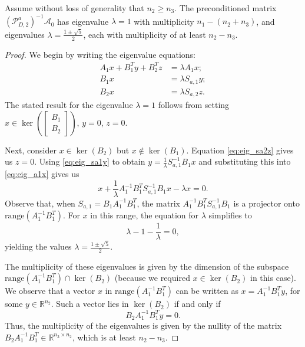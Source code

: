 \documentclass[10pt,a4paper]{amsart}
\newcommand{\range}{\mathrm{range}}
\newcommand{\sA}{\mathcal{A}}
\begin{document}
\begin{theorem}[Eigenvalues of $(\mathcal{P}_{D,2}^a)^{-1} \sA_0$]
Assume without loss of generality that $n_2 \ge n_3$. The preconditioned matrix $(\mathcal{P}_{D,2}^a)^{-1} \sA_0$ has eigenvalue $\lambda = 1$ with multiplicity $n_1-(n_2+n_3)$, and eigenvalues $\lambda = \frac{1 \pm \sqrt{5}}{2}$, each with multiplicity of at least $n_2-n_3$.
\end{theorem}

\begin{proof}
    We begin by writing the eigenvalue equations:
    \begin{subequations}\label{eq:eig_blocktri_noreg_prec}
        \begin{align}
            A_1 x + B_1^T y + B_2^T z &= \lambda A_1 x; \label{eq:eig_a1x}\\ 
            B_1 x &= \lambda S_{a,1} y; \label{eq:eig_sa1y}\\ 
            B_2 x &= \lambda S_{a,2} z. \label{eq:eig_sa2z}
        \end{align}
    \end{subequations}
    The stated result for the eigenvalue $\lambda =1$ follows from setting $x \in \ker\left(\begin{bmatrix} B_1 \\ B_2 \end{bmatrix} \right)$, $y=0$, $z=0$.

    Next, consider $x \in \ker(B_2)$ but $x \notin \ker(B_1)$. Equation \eqref{eq:eig_sa2z} gives us $z=0$. Using \eqref{eq:eig_sa1y} to obtain $y = \frac{1}{\lambda}S_{a,1}^{-1}B_1x$ and substituting this into \eqref{eq:eig_a1x} gives us
    \[
    x + \frac{1}{\lambda} A_1^{-1}B_1^T S_{a,1}^{-1}B_1 x - \lambda x = 0.
    \]
    Observe that, when $S_{a,1} = B_1A_1^{-1}B_1^T$, the matrix $A_1^{-1}B_1^T S_{a,1}^{-1}B_1$ is a projector onto $\range(A_1^{-1}B_1^T)$.
    For $x$ in this range, the equation for $\lambda$ simplifies to
    \[
    \lambda - 1 - \frac{1}{\lambda} = 0,
    \]
    yielding the values $\lambda = \frac{1\pm \sqrt{5}}{2}$.

    The multiplicity of these eigenvalues is given by the dimension of the subspace $\range(A_1^{-1} B_1^T) \cap \ker(B_2)$ (because we required $x \in \ker(B_2)$ in this case). We observe that a vector $x$ in $\range(A_1^{-1} B_1^T)$ can be written as $x = A_1^{-1} B_1^Ty$, for some $y \in \mathbb{R}^{n_2}$. Such a vector lies in $\ker(B_2)$ if and only if
    \[
    B_2 A_1^{-1}B_1^T y = 0.
    \]
    Thus, the multiplicity of the eigenvalues is given by the nullity of the matrix \\ $B_2 A_1^{-1}B_1^T \in \mathbb{R}^{n_3 \times n_2}$, which is at least $n_2 - n_3$.
\end{proof}
\end{document}
